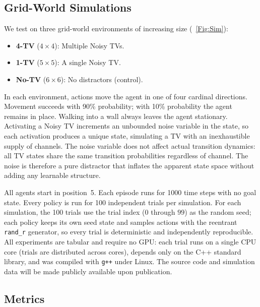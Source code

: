 \documentclass[letterpaper]{article} %
\begin{document}
\subsection{Grid-World Simulations}

We test on three grid-world environments of increasing size
(\figurename~\ref{Fig:Sim}):
\begin{itemize}
  \item \textbf{4-TV} ($4 \times 4$): Multiple Noisy TVs.
  \item \textbf{1-TV} ($5 \times 5$): A single Noisy TV.
  \item \textbf{No-TV} ($6 \times 6$): No distractors (control).
\end{itemize}

In each environment, actions move the agent in one of four cardinal
directions.  Movement succeeds with 90\% probability; with 10\%
probability the agent remains in place.  Walking into a wall always
leaves the agent stationary.  Activating a Noisy TV increments an unbounded noise variable in the
state, so each activation produces a unique state, simulating a TV
with an inexhaustible supply of channels.  The noise variable does
not affect actual transition dynamics: all TV states share the same
transition probabilities regardless of channel.  The noise is
therefore a pure distractor that inflates the apparent state space
without adding any learnable structure.

All agents start in position~5.  Each episode runs for 1000 time
steps with no goal state.  Every policy is run for 100 independent
trials per simulation.  For each simulation, the 100 trials use the
trial index ($0$ through $99$) as the random seed; each policy keeps
its own seed state and samples actions with the reentrant
\texttt{rand\_r} generator, so every trial is deterministic and
independently reproducible.  All experiments are tabular and require
no GPU: each trial runs on a single CPU core (trials are distributed
across cores), depends only on the C++ standard library, and was
compiled with \texttt{g++} under Linux.  The source code and
simulation data will be made publicly available upon publication.

\subsection{Metrics}
\end{document}

